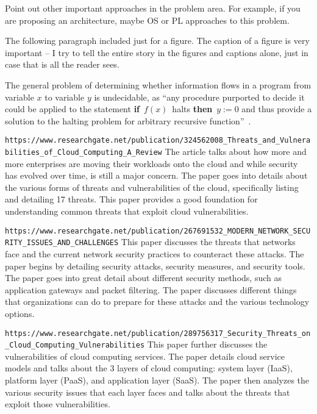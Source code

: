 
Point out other important approaches in the problem area. For example, if you 
are proposing an architecture, maybe OS or PL approaches to this problem. 

The following paragraph included just for a figure. The caption of a figure is very
important -- I try to tell the entire story in the figures and captions alone, 
just in case that is all the reader sees.

The general problem of determining whether information flows in a program from
variable $x$ to variable $y$ is undecidable, as ``any procedure purported to
decide it could be applied to the statement {\bf if}~$f(x)$~halts {\bf then}~$y
:= 0$ and thus provide a solution to the halting problem for arbitrary
recursive function''~\cite{denning-impossible}.  

\verb|https://www.researchgate.net/publication/324562008_Threats_and_Vulnerabilities_of_Cloud_Computing_A_Review|
The article talks about how more and more enterprises are moving their workloads onto the cloud and while
security has evolved over time, is still a major concern. The paper goes into details about the various forms
of threats and vulnerabilities of the cloud, specifically listing and detailing 17 threats. This paper
provides a good foundation for understanding common threats that exploit cloud vulnerabilities.

\verb|https://www.researchgate.net/publication/267691532_MODERN_NETWORK_SECURITY_ISSUES_AND_CHALLENGES|
This paper discusses the threats that networks face and the current network security practices to counteract these attacks.
The paper begins by detailing security attacks, security measures, and security tools. The paper goes into great detail about
different security methods, such as application gateways and packet filtering. The paper discusses different things that organizations
can do to prepare for these attacks and the various technology options.

\verb|https://www.researchgate.net/publication/289756317_Security_Threats_on_Cloud_Computing_Vulnerabilities|
This paper further discusses the vulnerabilities of cloud computing services. The paper details cloud service models and talks about
the 3 layers of cloud computing: system layer (IaaS), platform layer (PaaS), and application layer (SaaS). The paper then analyzes
the various security issues that each layer faces and talks about the threats that exploit those vulnerabilities.

